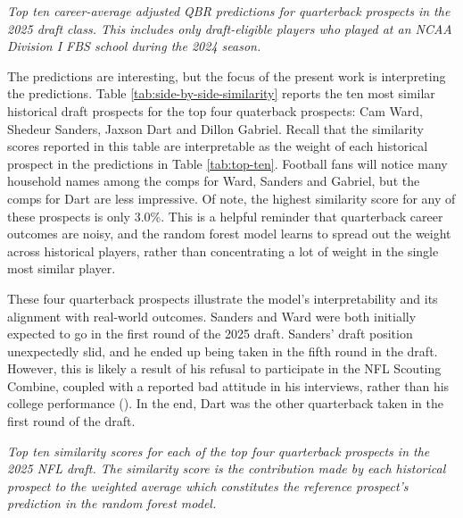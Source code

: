 \documentclass{article}
\begin{document}
\begin{table}[H]
  \centering
  
  \caption{\textit{Top ten career-average adjusted QBR predictions for quarterback prospects in the 2025 draft class. This includes only draft-eligible players who played at an NCAA Division I FBS school during the 2024 season.}}
  \label{tab:top-ten}
\end{table}

The predictions are interesting, but the focus of the present work is interpreting the predictions. Table \ref{tab:side-by-side-similarity} reports the ten most similar historical draft prospects for the top four quaterback prospects: Cam Ward, Shedeur Sanders, Jaxson Dart and Dillon Gabriel. Recall that the similarity scores reported in this table are interpretable as the weight of each historical prospect in the predictions in Table \ref{tab:top-ten}. Football fans will notice many household names among the comps for Ward, Sanders and Gabriel, but the comps for Dart are less impressive. Of note, the highest similarity score for any of these prospects is only 3.0\%. This is a helpful reminder that quarterback career outcomes are noisy, and the random forest model learns to spread out the weight across historical players, rather than concentrating a lot of weight in the single most similar player.

These four quarterback prospects illustrate the model's interpretability and its alignment with real-world outcomes. Sanders and Ward were both initially expected to go in the first round of the 2025 draft. Sanders' draft position unexpectedly slid, and he ended up being taken in the fifth round in the draft. However, this is likely a result of his refusal to participate in the NFL Scouting Combine, coupled with a reported bad attitude in his interviews, rather than his college performance (\cite{mckenna_what_nodate}). In the end, Dart was the other quarterback taken in the first round of the draft.

\begin{table}[H]
  \resizebox{\textwidth}{!}{
    
  }
  \caption{\textit{Top ten similarity scores for each of the top four quarterback prospects in the 2025 NFL draft. The similarity score is the contribution made by each historical prospect to the weighted average which constitutes the reference prospect's prediction in the random forest model.}}
  \label{tab:side-by-side-similarity}
\end{table}
\end{document}
